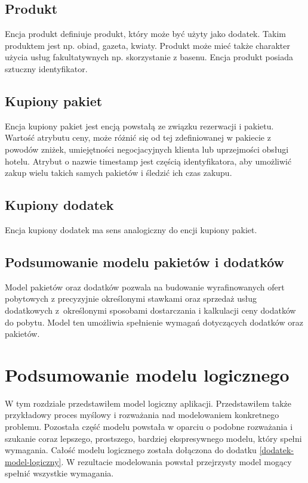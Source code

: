 \documentclass[a4paper,onecolumn,oneside,11pt,wide,floatssmall]{mwrep}
\theoremstyle{definition}
\theoremstyle{plain}%
\theoremstyle{remark}
\begin{document}
\subsection{Produkt}
\label{model-produkt}
Encja produkt definiuje produkt, który może być użyty jako dodatek. Takim produktem jest np. obiad, gazeta, kwiaty. Produkt może mieć także charakter użycia usług fakultatywnych np. skorzystanie z basenu. Encja produkt posiada sztuczny identyfikator.

\subsection{Kupiony pakiet}
Encja kupiony pakiet jest encją powstałą ze związku rezerwacji i pakietu. Wartość atrybutu ceny, może różnić się od tej zdefiniowanej w pakiecie z powodów zniżek, umiejętności negocjacyjnych klienta lub uprzejmości obsługi hotelu. Atrybut o nazwie timestamp jest częścią identyfikatora, aby umożliwić zakup wielu takich samych pakietów i śledzić ich czas zakupu.

\subsection{Kupiony dodatek}
Encja kupiony dodatek ma sens analogiczny do encji kupiony pakiet.

\subsection{Podsumowanie modelu pakietów i dodatków}
Model pakietów oraz dodatków pozwala na budowanie wyrafinowanych ofert pobytowych z precyzyjnie określonymi stawkami oraz sprzedaż usług dodatkowych \mbox{z określonymi} sposobami dostarczania i kalkulacji ceny dodatków do pobytu. Model ten umożliwia spełnienie wymagań dotyczących dodatków oraz pakietów.

\section{Podsumowanie modelu logicznego}
W tym rozdziale przedstawiłem model logiczny aplikacji. Przedstawiłem także przykładowy proces myślowy i rozważania nad modelowaniem konkretnego problemu. Pozostała część modelu powstała w oparciu o podobne rozważania i szukanie coraz lepszego, prostszego, bardziej ekspresywnego modelu, który spełni wymagania. Całość modelu logicznego została dołączona do dodatku \ref{dodatek-model-logiczny}. W rezultacie modelowania powstał przejrzysty model mogący spełnić wszystkie wymagania.
\end{document}
